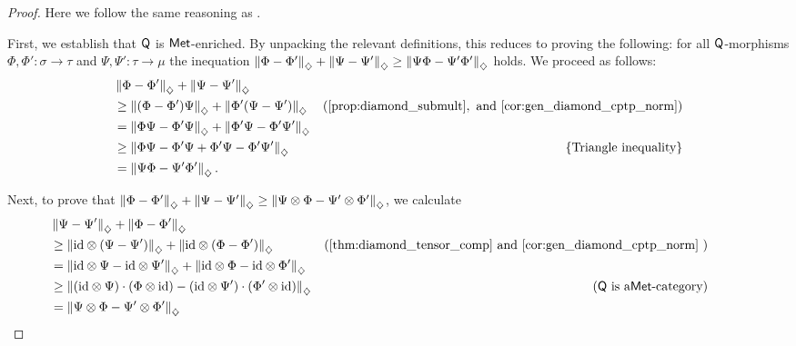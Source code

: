 \begin{proof}
  Here we follow the same reasoning as \cite[Proof of  Proposition 4.1]{dahlqvist2023syntactic}.

  First, we establish that $\mathsf{Q}$ is $\mathsf{Met}$-enriched. By unpacking the relevant definitions, this reduces to proving the following: for all $\mathsf{Q}$-morphisms $\Phi, \Phi' : \sigma \to \tau$ and $\Psi, \Psi' : \tau \to \mu$ the inequation $\left\lVert \Phi-\Phi' \right\rVert_{\diamondsuit} + \left\lVert \Psi-\Psi' \right\rVert_{\diamondsuit} \geq \left\lVert \Psi\Phi-\Psi'\Phi' \right\rVert_{\diamondsuit} $ holds. 
  We proceed as follows:
\begin{align*}
  & \diamondnorm{\Phi - \Phi'} + \diamondnorm{\Psi - \Psi'} \\
&\geq \diamondnorm{(\Phi - \Phi')\Psi} +  \diamondnorm{\Phi'(\Psi - \Psi')}  & (\text{\autoref{prop:diamond_submult}}, \text{ and \autoref{cor:gen_diamond_cptp_norm}}) \\
& = \diamondnorm{\Phi \Psi- \Phi' \Psi} +  \diamondnorm{\Phi'\Psi - \Phi' \Psi'} \\
& \geq  \diamondnorm{\Phi \Psi- \Phi' \Psi + \Phi'\Psi - \Phi' \Psi' }  & \{ \text{Triangle inequality} \} \\
&= \diamondnorm{\Psi\Phi-\Psi'\Phi'}.
\end{align*}

  Next, to prove that  $\left\lVert \Phi-\Phi' \right\rVert_{\diamondsuit} + \left\lVert \Psi-\Psi' \right\rVert_{\diamondsuit} \geq \left\lVert \Psi \otimes \Phi-\Psi' \otimes \Phi' \right\rVert_{\diamondsuit} $, we calculate
  \begin{align*}
      & \hspace{-30pt} \diamondnorm{\Psi - \Psi'} + \diamondnorm{\Phi - \Phi'} \\
      & \hspace{-30pt} \geq \diamondnorm{\id \otimes \left(\Psi-\Psi'\right)} + \diamondnorm{\id \otimes \left(\Phi-\Phi'\right)} & (\text{\autoref{thm:diamond_tensor_comp} and \autoref{cor:gen_diamond_cptp_norm} })  \\
      &\hspace{-30pt} =  \diamondnorm{\id \otimes \Psi- \id \otimes\Psi'} + \diamondnorm{\id \otimes \Phi- \id \otimes\Phi'} \\
      &\hspace{-30pt} \geq \diamondnorm{\left( \id \otimes \Psi \right) \cdot \left( \Phi \otimes \id \right) -  \left( \id \otimes \Psi' \right) \cdot \left( \Phi' \otimes \id \right)} & (\catQ \text{ is a} \mathsf{Met}\text{-category}) \\
      &\hspace{-30pt} = \diamondnorm{\Psi \otimes \Phi - \Psi' \otimes \Phi'}
  \end{align*}

\end{proof}

